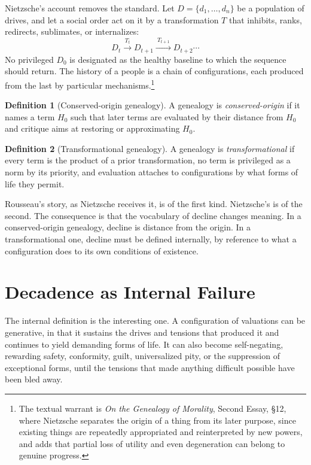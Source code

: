 \documentclass[11pt]{article}
\theoremstyle{definition}
\newtheorem{definition}{Definition}
\begin{document}
Nietzsche's account removes the standard. Let $D=\{d_1,\dots,d_n\}$ be a population of drives, and let a social order act on it by a transformation $T$ that inhibits, ranks, redirects, sublimates, or internalizes:
\[
D_t \xrightarrow{\ T_t\ } D_{t+1} \xrightarrow{\ T_{t+1}\ } D_{t+2} \cdots
\]
No privileged $D_0$ is designated as the healthy baseline to which the sequence should return. The history of a people is a chain of configurations, each produced from the last by particular mechanisms.\footnote{The textual warrant is \emph{On the Genealogy of Morality}, Second Essay, \S12, where Nietzsche separates the origin of a thing from its later purpose, since existing things are repeatedly appropriated and reinterpreted by new powers, and adds that partial loss of utility and even degeneration can belong to genuine progress.}

\begin{definition}[Conserved-origin genealogy]
A genealogy is \emph{conserved-origin} if it names a term $H_0$ such that later terms are evaluated by their distance from $H_0$ and critique aims at restoring or approximating $H_0$.
\end{definition}

\begin{definition}[Transformational genealogy]
A genealogy is \emph{transformational} if every term is the product of a prior transformation, no term is privileged as a norm by its priority, and evaluation attaches to configurations by what forms of life they permit.
\end{definition}

Rousseau's story, as Nietzsche receives it, is of the first kind. Nietzsche's is of the second. The consequence is that the vocabulary of decline changes meaning. In a conserved-origin genealogy, decline is distance from the origin. In a transformational one, decline must be defined internally, by reference to what a configuration does to its own conditions of existence.

\section{Decadence as Internal Failure}

The internal definition is the interesting one. A configuration of valuations can be generative, in that it sustains the drives and tensions that produced it and continues to yield demanding forms of life. It can also become self-negating, rewarding safety, conformity, guilt, universalized pity, or the suppression of exceptional forms, until the tensions that made anything difficult possible have been bled away.
\end{document}
